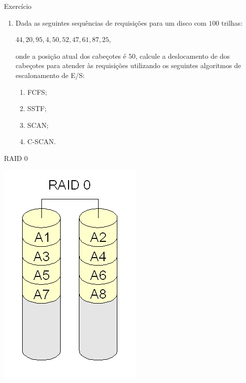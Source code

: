 
\begin{frame}{Exercício}

  \begin{enumerate}
  \item Dada as seguintes sequências de requisições para um 
    disco com $100$ trilhas:
    \begin{center}
      $44, 20, 95, 4, 50, 52, 47, 61, 87, 25$,
    \end{center}
    onde a posição atual dos cabeçotes é $50$, calcule a deslocamento
    de dos cabeçotes para atender às requisições utilizando os
    seguintes algoritmos de escalonamento de E/S:
    \begin{enumerate}
    \item FCFS;
    \item SSTF;
    \item SCAN;
    \item C-SCAN.
    \end{enumerate}
  \end{enumerate}
  
\end{frame}




\begin{frame}{RAID 0}
  
  \includegraphics[scale=.3]{../img/raid0.png}

\end{frame}


